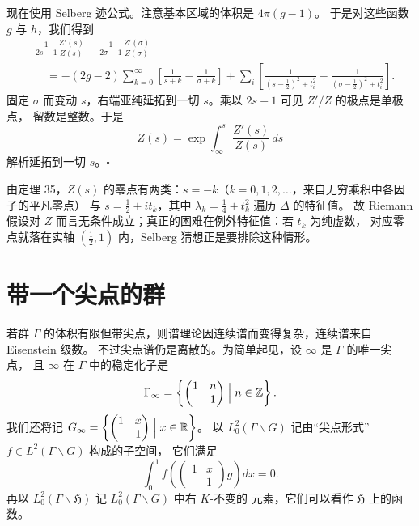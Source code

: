 现在使用 Selberg 迹公式。注意基本区域的体积是 $4\pi(g-1)$。
于是对这些函数 $g$ 与 $h$，我们得到
\[
\begin{aligned}
&\frac{1}{2s-1}\frac{Z'(s)}{Z(s)}-\frac{1}{2\sigma-1}\frac{Z'(\sigma)}{Z(\sigma)}\\
&\quad=-(2g-2)\sum_{k=0}^{\infty}\left[\frac{1}{s+k}-\frac{1}{\sigma+k}\right]
+\sum_{i}\left[\frac{1}{\left(s-\frac12\right)^{2}+t_{i}^{2}}
-\frac{1}{\left(\sigma-\frac12\right)^{2}+t_{i}^{2}}\right].
\end{aligned}
\]
固定 $\sigma$ 而变动 $s$，右端亚纯延拓到一切 $s$。乘以 $2s-1$ 可见 $Z'/Z$ 的极点是单极点，
留数是整数。于是
\[
Z(s)=\exp\int_{\infty}^{s}\frac{Z'(s)}{Z(s)}\,ds
\]
解析延拓到一切 $s$。\hfill$\square$

\begin{annote}
由定理 35，$Z(s)$ 的零点有两类：$s=-k$（$k=0,1,2,\dots$，来自无穷乘积中各因子的平凡零点）
与 $s=\tfrac12\pm it_{k}$，其中 $\lambda_{k}=\tfrac14+t_{k}^{2}$ 遍历 $\Delta$ 的特征值。
故 Riemann 假设对 $Z$ 而言无条件成立；真正的困难在例外特征值：若 $t_{k}$ 为纯虚数，
对应零点就落在实轴 $(\tfrac12,1)$ 内，Selberg 猜想正是要排除这种情形。
\par\vspace{0.15em}{\raggedleft 【来源：Selberg, J. Indian Math. Soc. 20 (1956)；Hejhal, Vol.~2, Ch.~2（A）】\par}
\end{annote}

\section{带一个尖点的群}

若群 $\Gamma$ 的体积有限但带尖点，则谱理论因连续谱而变得复杂，连续谱来自 Eisenstein 级数。
不过尖点谱仍是离散的。为简单起见，设 $\infty$ 是 $\Gamma$ 的唯一尖点，
且 $\infty$ 在 $\Gamma$ 中的稳定化子是
\[
\Gamma_{\infty}=\left\{\begin{pmatrix}1&n\\&1\end{pmatrix}\Bigm|n\in\mathbb{Z}\right\}.
\]
我们还将记 $G_{\infty}=\left\{\begin{pmatrix}1&x\\&1\end{pmatrix}\Bigm|x\in\mathbb{R}\right\}$。
以 $L_{0}^{2}(\Gamma\backslash G)$ 记由“尖点形式” $f\in L^{2}(\Gamma\backslash G)$ 构成的子空间，
它们满足
\begin{equation}\tag{40}
\int_{0}^{1}f\left(\begin{pmatrix}1&x\\&1\end{pmatrix}g\right)dx=0 .
\end{equation}
再以 $L_{0}^{2}(\Gamma\backslash\mathfrak{H})$ 记 $L_{0}^{2}(\Gamma\backslash G)$ 中右 $K$-不变的
元素，它们可以看作 $\mathfrak{H}$ 上的函数。

